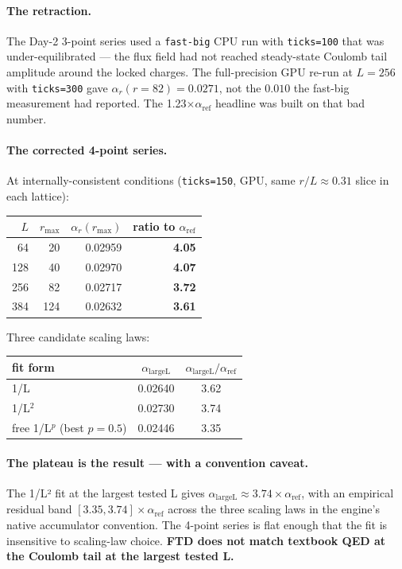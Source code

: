 \documentclass[11pt,letterpaper]{article}
\newcommand{\alphaLargeL}{\alpha_{\mathrm{largeL}}}
\begin{document}
\paragraph{The retraction.}
The Day-2 3-point series used a \verb|fast-big| CPU run with
\verb|ticks=100| that was under-equilibrated --- the flux field had
not reached steady-state Coulomb tail amplitude around the locked
charges. The full-precision GPU re-run at $L=256$ with
\verb|ticks=300| gave $\alpha_r(r=82) = 0.0271$, not the $0.010$ the
fast-big measurement had reported. The 1.23$\times \alpha_{\text{ref}}$
headline was built on that bad number.

\paragraph{The corrected 4-point series.}
At internally-consistent conditions (\verb|ticks=150|, GPU, same
$r/L \approx 0.31$ slice in each lattice):

\begin{center}
\begin{tabular}{rrrr}
\toprule
$L$ & $r_{\max}$ & $\alpha_r(r_{\max})$ & ratio to $\alpha_{\text{ref}}$ \\
\midrule
64 & 20 & 0.02959 & \textbf{4.05} \\
128 & 40 & 0.02970 & \textbf{4.07} \\
256 & 82 & 0.02717 & \textbf{3.72} \\
384 & 124 & 0.02632 & \textbf{3.61} \\
\bottomrule
\end{tabular}
\end{center}

Three candidate scaling laws:

\begin{center}
\begin{tabular}{lcc}
\toprule
fit form & $\alphaLargeL$ & $\alphaLargeL / \alpha_{\text{ref}}$ \\
\midrule
1/L & 0.02640 & 3.62 \\
1/L$^2$ & 0.02730 & 3.74 \\
free 1/L$^p$ (best $p = 0.5$) & 0.02446 & 3.35 \\
\bottomrule
\end{tabular}
\end{center}

\paragraph{The plateau is the result --- with a convention caveat.}
The 1/L² fit at the largest tested L gives $\alphaLargeL \approx
3.74 \times \alpha_{\text{ref}}$, with an empirical residual band
$[3.35, 3.74] \times \alpha_{\text{ref}}$ across the three scaling
laws in the engine's native accumulator convention. The 4-point
series is flat enough that the fit is insensitive to scaling-law
choice. \textbf{FTD does not match textbook QED at the Coulomb tail
at the largest tested L.}
\end{document}
